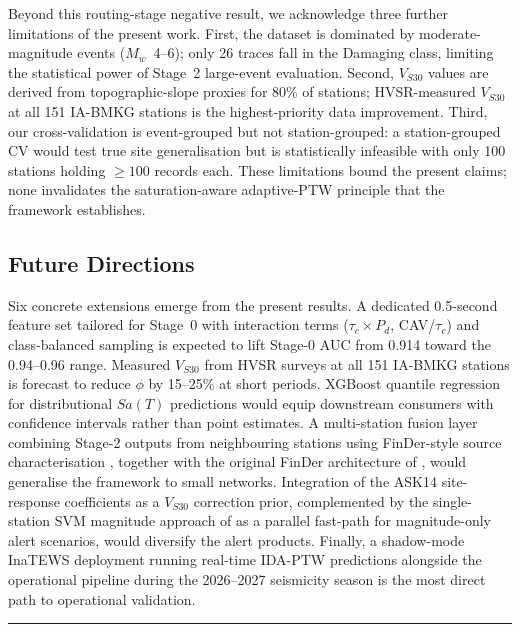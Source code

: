 \documentclass[10pt]{article}
\renewcommand{\cite}[1]{\citep{#1}}
\begin{document}
Beyond this routing-stage negative result, we acknowledge three further limitations of the present work. First, the dataset is dominated by moderate-magnitude events ($M_w$~4--6); only 26 traces fall in the Damaging class, limiting the statistical power of Stage~2 large-event evaluation. Second, $V_{S30}$ values are derived from topographic-slope proxies for 80\% of stations; HVSR-measured $V_{S30}$ at all 151 IA-BMKG stations is the highest-priority data improvement. Third, our cross-validation is event-grouped but not station-grouped: a station-grouped CV would test true site generalisation but is statistically infeasible with only 100 stations holding $\geq 100$ records each. These limitations bound the present claims; none invalidates the saturation-aware adaptive-PTW principle that the framework establishes.

\subsection{Future Directions}

Six concrete extensions emerge from the present results. A dedicated 0.5-second feature set tailored for Stage~0 with interaction terms ($\tau_c \times P_d$, CAV/$\tau_c$) and class-balanced sampling is expected to lift Stage-0 AUC from 0.914 toward the 0.94--0.96 range. Measured $V_{S30}$ from HVSR surveys \cite{ref87} at all 151 IA-BMKG stations is forecast to reduce $\phi$ by 15--25\% at short periods. XGBoost quantile regression for distributional $Sa(T)$ predictions \cite{ref36} would equip downstream consumers with confidence intervals rather than point estimates. A multi-station fusion layer combining Stage-2 outputs from neighbouring stations using FinDer-style source characterisation \cite{ref88}, together with the original FinDer architecture of \citet{ref72}, would generalise the framework to small networks. Integration of the \citet{ref70} ASK14 site-response coefficients as a $V_{S30}$ correction prior, complemented by the single-station SVM magnitude approach of \citet{ref73} as a parallel fast-path for magnitude-only alert scenarios, would diversify the alert products. Finally, a shadow-mode InaTEWS deployment running real-time IDA-PTW predictions alongside the operational pipeline during the 2026--2027 seismicity season is the most direct path to operational validation.

\begin{center}\rule{0.5\linewidth}{0.5pt}\end{center}
\end{document}
